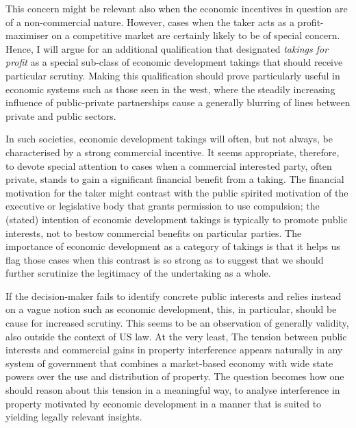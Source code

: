 {This concern might be relevant also when the economic incentives in question are of a non-commercial nature. However, cases when the taker acts as a profit-maximiser on a competitive market are certainly likely to be of special concern. Hence, I will argue for an additional qualification that designated {\it takings for profit} as a special sub-class of economic development takings that should receive particular scrutiny. Making this qualification should prove particularly useful in economic systems such as those seen in the west, where the steadily increasing influence of public-private partnerships cause a generally blurring of lines between private and public sectors.

In such societies, economic development takings will often, but not always, be characterised by a strong commercial incentive. It seems appropriate, therefore, to devote special attention to cases when a commercial interested party, often private, stands to gain a significant financial benefit from a taking. The financial motivation for the taker might contrast with the public spirited motivation of the executive or legislative body that grants permission to use compulsion; the (stated) intention of economic development takings is typically to promote public interests, not to bestow commercial benefits on particular parties. The importance of economic development as a category of takings is that it helps us flag those cases when this contrast is so strong as to suggest that we should further scrutinize the legitimacy of the undertaking as a whole.

If the decision-maker fails to identify concrete public interests and relies instead on a vague notion such as economic development, this, in particular, should be cause for increased scrutiny. This seems to be an observation of generally validity, also outside the context of US law. At the very least, The tension between public interests and commercial gains in property interference appears naturally in any system of government that combines a market-based economy with wide state powers over the use and distribution of property. The question becomes how one should reason about this tension in a meaningful way, to analyse interference in property motivated by economic development in a manner that is suited to yielding legally relevant insights.

}
